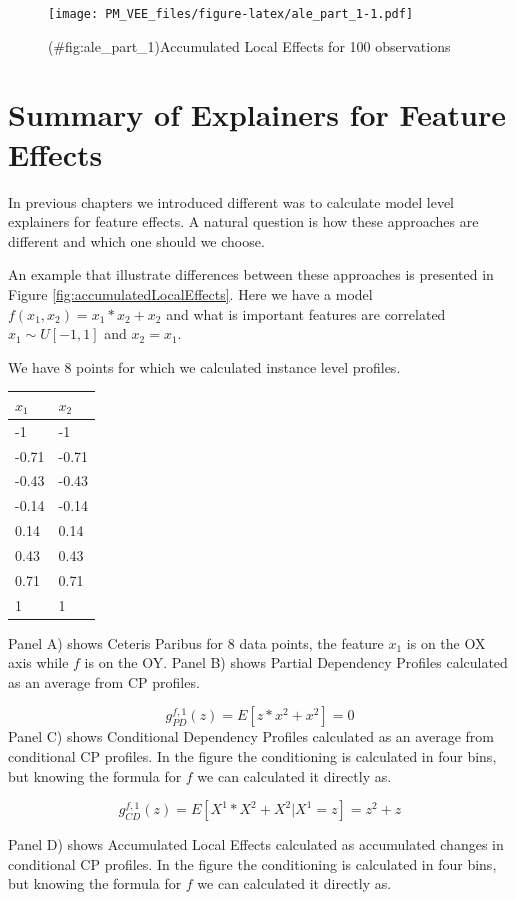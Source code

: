 \documentclass[12pt,]{krantz}
\begin{document}
\begin{figure}
\centering
\texttt{[image: PM\_VEE\_files/figure-latex/ale\_part\_1-1.pdf]}
\caption{(\#fig:ale\_part\_1)Accumulated Local Effects for 100 observations}
\end{figure}

\hypertarget{summaryFeatureEffects}{%
\section{Summary of Explainers for Feature Effects}\label{summaryFeatureEffects}}

In previous chapters we introduced different was to calculate model level explainers for feature effects.
A natural question is how these approaches are different and which one should we choose.

An example that illustrate differences between these approaches is presented in Figure \ref{fig:accumulatedLocalEffects}.
Here we have a model \(f(x_1, x_2) = x_1*x_2 + x_2\) and what is important features are correlated \(x_1 \sim U[-1,1]\) and \(x_2 = x_1\).

We have 8 points for which we calculated instance level profiles.

\begin{longtable}[]{@{}ll@{}}
\toprule
\(x_1\) & \(x_2\)\tabularnewline
\midrule
\endhead
-1 & -1\tabularnewline
-0.71 & -0.71\tabularnewline
-0.43 & -0.43\tabularnewline
-0.14 & -0.14\tabularnewline
0.14 & 0.14\tabularnewline
0.43 & 0.43\tabularnewline
0.71 & 0.71\tabularnewline
1 & 1\tabularnewline
\bottomrule
\end{longtable}

Panel A) shows Ceteris Paribus for 8 data points, the feature \(x_1\) is on the OX axis while \(f\) is on the OY.
Panel B) shows Partial Dependency Profiles calculated as an average from CP profiles.

\[
g_{PD}^{f,1}(z) = E[z*x^2 + x^2] = 0
\]
Panel C) shows Conditional Dependency Profiles calculated as an average from conditional CP profiles. In the figure the conditioning is calculated in four bins, but knowing the formula for \(f\) we can calculated it directly as.

\[
g_{CD}^{f,1}(z) = E[X^1*X^2 + X^2 | X^1 = z] = z^2+z
\]

Panel D) shows Accumulated Local Effects calculated as accumulated changes in conditional CP profiles. In the figure the conditioning is calculated in four bins, but knowing the formula for \(f\) we can calculated it directly as.
\end{document}
